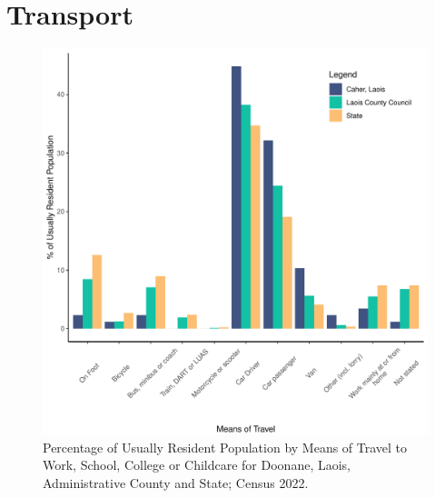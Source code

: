 \documentclass{article}
\begin{document}
\section{Transport}\label{sect:Trans}
\begin{figure}[H]
	\centering
	\includegraphics[width = 120mm]{../figures/TravelED.pdf}
	\caption{Percentage of Usually Resident Population by Means of Travel to Work, School, College or Childcare for Doonane, Laois, Administrative County and State; Census 2022.}
	\label{fig:vbnv}
	\end{figure}
\end{document}
